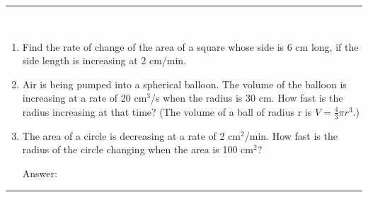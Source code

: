 \documentclass[calc1-main.tex]{subfiles}
\begin{document}
\rule{\textwidth}{1pt}
\begin{multicols}{2}
\begin{exercise}
~\\
  \begin{enumerate}
    \item Find the rate of change of the area of a square whose side is 6 cm long, if the side length is increasing at 2 cm/min.
    \item Air is being pumped into a spherical balloon. The volume of the balloon is increasing at a rate of 20 cm$^3$/s when the radius is 30 cm. How fast is the radius increasing at that time? (The volume of a ball of radius r is $V=\frac{4}{3} \pi r^3$.)

    \item The area of a circle is decreasing at a rate of 2 cm$^2$/min. How fast is the radius of the circle changing when the area is 100 cm$^2$?

    Answer:
  \end{enumerate}
\end{exercise}
\end{multicols}
\rule{\textwidth}{1pt}
\end{document}
